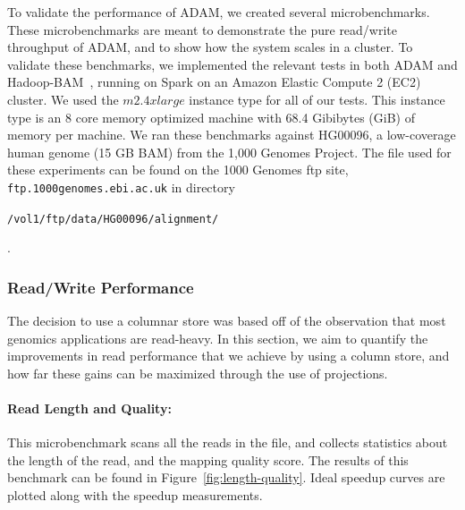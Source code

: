 \documentclass[10pt,twocolumn]{article}
\theoremstyle{plain}
\begin{document}
To validate the performance of ADAM, we created several microbenchmarks. These microbenchmarks are meant to demonstrate
the pure read/write throughput of ADAM, and to show how the system scales in a cluster. To validate these benchmarks, we implemented
the relevant tests in both ADAM and Hadoop-BAM~\cite{niemenmaa12}, running on Spark on an Amazon Elastic Compute 2 (EC2)
cluster. We used the $m2.4xlarge$ instance type for all of our tests. This instance type is an 8 core memory optimized machine
with 68.4 Gibibytes (GiB) of memory per machine. We ran these benchmarks against HG00096, a low-coverage human genome (15 GB
BAM) from the 1,000 Genomes Project. The file used for these experiments can be found on the 1000 Genomes ftp site, \texttt{ftp.1000genomes.ebi.ac.uk} in directory 
\begin{small}\texttt{/vol1/ftp/data/HG00096/alignment/}\end{small}.

\subsubsection{Read/Write Performance}
\label{sec:read-write-performance}

The decision to use a columnar store was based off of the observation that most genomics applications are read-heavy. In this section,
we aim to quantify the improvements in read performance that we achieve by using a column store, and how far these gains can be
maximized through the use of projections.

\paragraph{Read Length and Quality:}
\label{sec:read-length-and-quality}

This microbenchmark scans all the reads in the file, and collects statistics about the length of the read, and the mapping quality score.
The results of this benchmark can be found in Figure~\ref{fig:length-quality}. Ideal speedup curves are plotted along with the speedup measurements.
\end{document}
